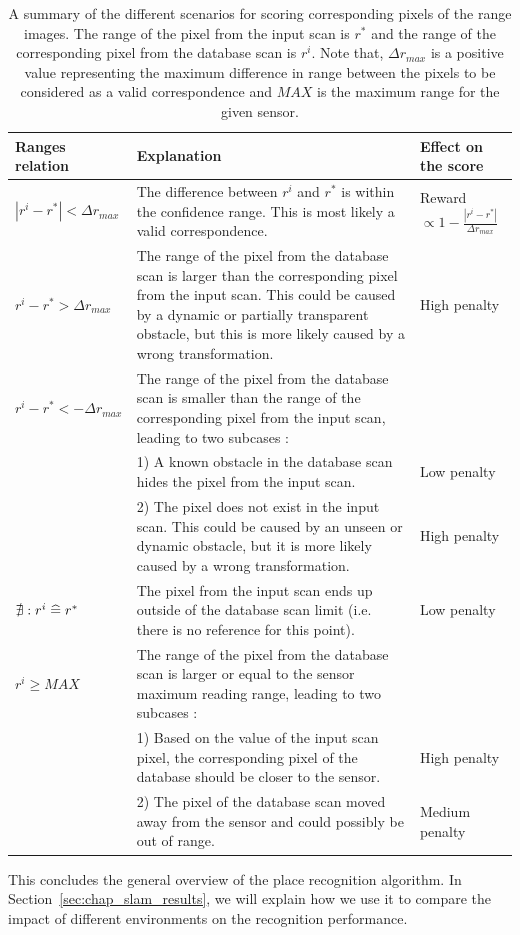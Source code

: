 \begin{table}[H]
    \centering
    \begin{tabular}{@{}p{}p{}p{}@{}}
        \toprule %
        \textbf{Ranges relation}         & \textbf{Explanation}                                                                                                    & \textbf{Effect on the score} \\
        \hline                           
        $|r^i - r^*| < \Delta r_{max}$   & The difference between $r^i$ and $r^*$ is within the confidence range. This is most likely a valid correspondence.      & Reward $\propto 1-\frac{|r^i-r^*|}{\Delta r_{max}}$ \\
        $r^i - r^* > \Delta r_{max}$     & The range of the pixel from the database scan is larger than the corresponding pixel from the input scan. This could be caused by a dynamic or partially transparent obstacle, but this is more likely caused by a wrong transformation. & High penalty \\
        $r^i - r^* < -\Delta r_{max}$    & The range of the pixel from the database scan is smaller than the range of the corresponding pixel from the input scan, leading to two subcases : & \\
                                         & 1) A known obstacle in the database scan hides the pixel from the input scan.                                           & Low penalty \\
                                         & 2) The pixel does not exist in the input scan. This could be caused by an unseen or dynamic obstacle, but it is more likely caused by a wrong transformation.       & High penalty \\
        $\nexists : r^i \mathrel{\widehat{=}} r^*$ & The pixel from the input scan ends up outside of the database scan limit (i.e. there is no reference for this point).   & Low penalty \\
        $r^i \ge MAX$                    & The range of the pixel from the database scan is larger or equal to the sensor maximum reading range, leading to two subcases : & \\
                                         & 1) Based on the value of the input scan pixel, the corresponding pixel of the database should be closer to the sensor.  & High penalty \\
                                         & 2) The pixel of the database scan moved away from the sensor and could possibly be out of range.                        & Medium penalty \\
        \bottomrule
    \end{tabular}
    \caption{A summary of the different scenarios for scoring corresponding pixels of the range images. The range of the pixel from the input scan is $r^*$ and the range of the corresponding pixel from the database scan is $r^i$. Note that, $\Delta r_{max}$ is a positive value representing the maximum difference in range between the pixels to be considered as a valid correspondence and $MAX$ is the maximum range for the given sensor.}
    \label{tab:chap_slam_scoring_scenarios}
\end{table}

This concludes the general overview of the place recognition algorithm. In Section~\ref{sec:chap_slam_results}, we will explain how we use it to compare the impact of different environments on the recognition performance.
